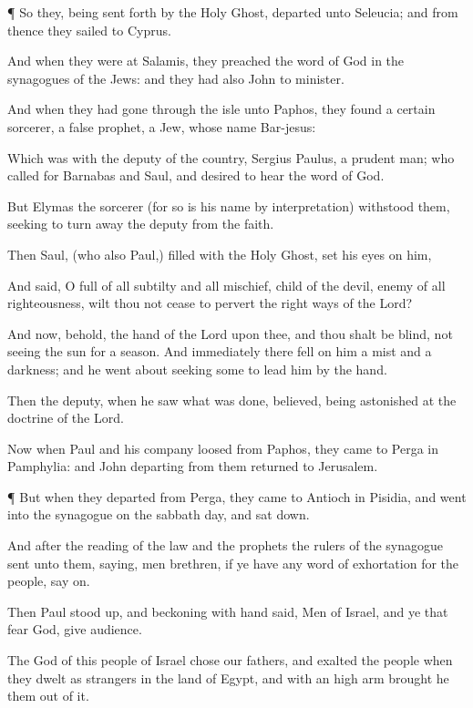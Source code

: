 {\par }{\PP {}¶
So
they, being sent
forth
by the
Holy
Ghost,
departed
unto
Seleucia;
and from
thence they
sailed
to
Cyprus.

And when they
were
at
Salamis, they
preached the
word of
God
in the
synagogues of the
Jews:
and they
had
also John
to
{}
minister.

And when they had gone
through the
isle
unto
Paphos, they
found a
certain
sorcerer, a false
prophet, a
Jew,
whose
name
{}
Bar-jesus:

Which
was
with the deputy of the
country,
Sergius
Paulus, a
prudent
man;
who called
for
Barnabas
and
Saul, and
desired to
hear the
word of
God.

But
Elymas the
sorcerer (for
so
is
his
name by
interpretation)
withstood
them,
seeking to turn
away the
deputy
from the
faith.

Then
Saul, (who
also
{}
Paul,) filled
with the
Holy
Ghost, set his
eyes
on
him,

And
said,
O
full of
all
subtilty
and
all
mischief,
{}
child of the
devil,
{}
enemy of
all
righteousness, wilt
thou
not
cease to
pervert the
right
ways of the
Lord?

And
now,
behold, the
hand of the
Lord
{}
upon
thee,
and thou shalt
be
blind,
not
seeing the
sun
for a
season.
And
immediately there
fell
on
him a
mist
and a
darkness;
and he went
about
seeking some to lead him by the
hand.

Then the
deputy, when he
saw what was
done,
believed, being
astonished
at the
doctrine of the
Lord.

Now
when
Paul and his
company
loosed
from
Paphos, they
came
to
Perga in
Pamphylia:
and
John
departing
from
them
returned
to
Jerusalem.


\par }{\PP {}¶ But
when
they
departed
from
Perga, they
came
to
Antioch in
Pisidia,
and
went
into the
synagogue on the
sabbath
day, and sat
down.

And
after the
reading of the
law
and the
prophets the rulers of the
synagogue
sent
unto
them,
saying,
{}
men
{}
brethren,
if ye
have any
word of
exhortation
for the
people, say
on.

Then
Paul stood
up,
and beckoning
with
{}
hand
said,
Men of
Israel,
and ye that
fear
God, give
audience.

The
God of
this
people of
Israel
chose
our
fathers,
and
exalted the
people
when they dwelt as
strangers
in the
land of
Egypt,
and
with an
high
arm brought
he
them
out of
it.

}
